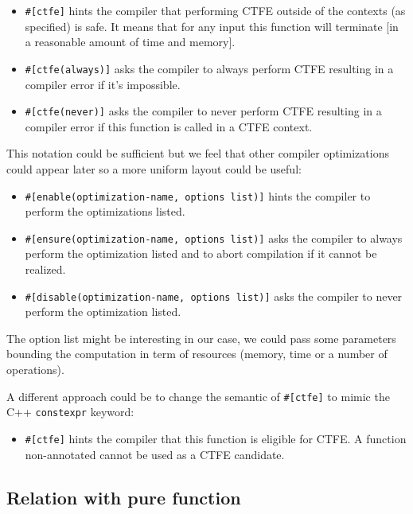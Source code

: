 \documentclass[a4paper,11pt]{article}
\begin{document}
\begin{itemize}
\item \lstinline{#[ctfe]} hints the compiler that performing CTFE outside of the contexts (as specified) is safe. It means that for any input this function will terminate [in a reasonable amount of time and memory].
\item \lstinline{#[ctfe(always)]} asks the compiler to always perform CTFE resulting in a compiler error if it's impossible.
\item \lstinline{#[ctfe(never)]} asks the compiler to never perform CTFE resulting in a compiler error if this function is called in a CTFE context.
\end{itemize}

This notation could be sufficient but we feel that other compiler optimizations could appear later so a more uniform layout could be useful:

\begin{itemize}
\item \lstinline{#[enable(optimization-name, options list)]} hints the compiler to perform the optimizations listed.
\item \lstinline{#[ensure(optimization-name, options list)]} asks the compiler to always perform the optimization listed and to abort compilation if it cannot be realized.
\item \lstinline{#[disable(optimization-name, options list)]} asks the compiler to never perform the optimization listed.
\end{itemize}

The option list might be interesting in our case, we could pass some parameters bounding the computation in term of resources (memory, time or a number of operations).
\newline

A different approach could be to change the semantic of \lstinline{#[ctfe]} to mimic the C++ \lstinline{constexpr} keyword:

\begin{itemize}
\item \lstinline{#[ctfe]} hints the compiler that this function is eligible for CTFE. A function non-annotated cannot be used as a CTFE candidate.
\end{itemize}

\subsection{Relation with pure function}
\label{relation-pure}
\end{document}
